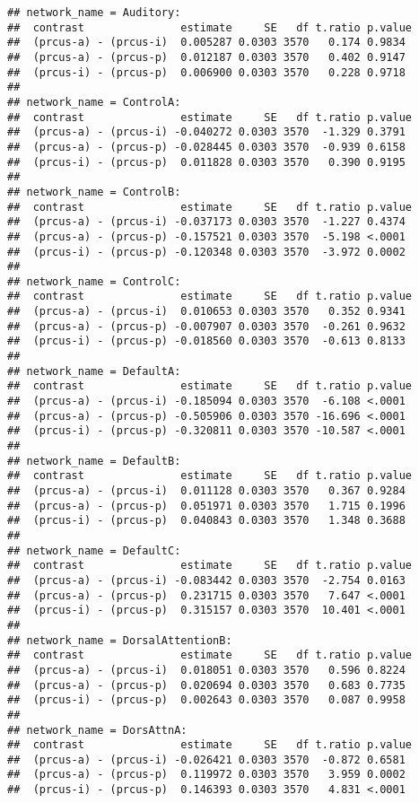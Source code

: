 \documentclass[
]{article}
\begin{document}
\begin{verbatim}
## network_name = Auditory:
##  contrast               estimate     SE   df t.ratio p.value
##  (prcus-a) - (prcus-i)  0.005287 0.0303 3570   0.174 0.9834 
##  (prcus-a) - (prcus-p)  0.012187 0.0303 3570   0.402 0.9147 
##  (prcus-i) - (prcus-p)  0.006900 0.0303 3570   0.228 0.9718 
## 
## network_name = ControlA:
##  contrast               estimate     SE   df t.ratio p.value
##  (prcus-a) - (prcus-i) -0.040272 0.0303 3570  -1.329 0.3791 
##  (prcus-a) - (prcus-p) -0.028445 0.0303 3570  -0.939 0.6158 
##  (prcus-i) - (prcus-p)  0.011828 0.0303 3570   0.390 0.9195 
## 
## network_name = ControlB:
##  contrast               estimate     SE   df t.ratio p.value
##  (prcus-a) - (prcus-i) -0.037173 0.0303 3570  -1.227 0.4374 
##  (prcus-a) - (prcus-p) -0.157521 0.0303 3570  -5.198 <.0001 
##  (prcus-i) - (prcus-p) -0.120348 0.0303 3570  -3.972 0.0002 
## 
## network_name = ControlC:
##  contrast               estimate     SE   df t.ratio p.value
##  (prcus-a) - (prcus-i)  0.010653 0.0303 3570   0.352 0.9341 
##  (prcus-a) - (prcus-p) -0.007907 0.0303 3570  -0.261 0.9632 
##  (prcus-i) - (prcus-p) -0.018560 0.0303 3570  -0.613 0.8133 
## 
## network_name = DefaultA:
##  contrast               estimate     SE   df t.ratio p.value
##  (prcus-a) - (prcus-i) -0.185094 0.0303 3570  -6.108 <.0001 
##  (prcus-a) - (prcus-p) -0.505906 0.0303 3570 -16.696 <.0001 
##  (prcus-i) - (prcus-p) -0.320811 0.0303 3570 -10.587 <.0001 
## 
## network_name = DefaultB:
##  contrast               estimate     SE   df t.ratio p.value
##  (prcus-a) - (prcus-i)  0.011128 0.0303 3570   0.367 0.9284 
##  (prcus-a) - (prcus-p)  0.051971 0.0303 3570   1.715 0.1996 
##  (prcus-i) - (prcus-p)  0.040843 0.0303 3570   1.348 0.3688 
## 
## network_name = DefaultC:
##  contrast               estimate     SE   df t.ratio p.value
##  (prcus-a) - (prcus-i) -0.083442 0.0303 3570  -2.754 0.0163 
##  (prcus-a) - (prcus-p)  0.231715 0.0303 3570   7.647 <.0001 
##  (prcus-i) - (prcus-p)  0.315157 0.0303 3570  10.401 <.0001 
## 
## network_name = DorsalAttentionB:
##  contrast               estimate     SE   df t.ratio p.value
##  (prcus-a) - (prcus-i)  0.018051 0.0303 3570   0.596 0.8224 
##  (prcus-a) - (prcus-p)  0.020694 0.0303 3570   0.683 0.7735 
##  (prcus-i) - (prcus-p)  0.002643 0.0303 3570   0.087 0.9958 
## 
## network_name = DorsAttnA:
##  contrast               estimate     SE   df t.ratio p.value
##  (prcus-a) - (prcus-i) -0.026421 0.0303 3570  -0.872 0.6581 
##  (prcus-a) - (prcus-p)  0.119972 0.0303 3570   3.959 0.0002 
##  (prcus-i) - (prcus-p)  0.146393 0.0303 3570   4.831 <.0001 

\end{verbatim}
\end{document}

